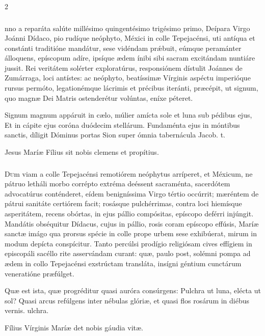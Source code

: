 \documentclass[9pt,twoside]{extarticle}
\begin{document}
\begin{multicols}{2}
\subsubsection*{\center {}}
nno a reparáta salúte millésimo quingentésimo trigésimo primo, Deípara Virgo Joánni Dídaco, pio rudíque neóphyto, Méxici in colle Tepejacénsi, uti antíqua et constánti traditióne mandátur, sese vidéndam prǽbuit, eúmque peramánter álloquens, epíscopum adíre, ipsíque ædem ínibi sibi sacram excitándam nuntiáre jussit. Rei veritátem solérter exploratúrus, responsiónem dístulit Joánnes de Zumárraga, loci antístes: ac neóphyto, beatíssimæ Vírginis aspéctu imperióque rursus permóto, legationémque lácrimis et précibus iteránti, præcépit, ut signum, quo magnæ Dei Matris ostenderétur volúntas, eníxe péteret.

\begin{tightlist}{}
\item {} Signum magnum appáruit in cælo, múlier amícta sole et luna sub pédibus ejus, \textred{*} Et in cápite ejus coróna duódecim stellárum.
 Fundaménta ejus in móntibus sanctis, díligit Dóminus portas Sion super ómnia tabernácula Jacob. t.
\item {\small {} Jesus Maríæ Fílius sit nobis clemens et propítius.}
\end{tightlist}

\subsubsection*{\center {}}
\lettrine{D}um viam a colle Tepejacénsi remotiórem neóphytus arríperet, et Méxicum, ne pátruo letháli morbo corrépto extréma deéssent sacraménta, sacerdótem advocatúrus conténderet, eídem benigníssima Virgo tértio occúrrit; mæréntem de pátrui sanitáte certiórem facit; rosásque pulchérrimas, contra loci hiemísque asperitátem, recens obórtas, in ejus pállio compósitas, epíscopo deférri injúngit. Mandátis obséquitur Dídacus, cujus in pállio, rosis coram epíscopo effúsis, Maríæ sanctæ imágo qua prorsus spécie in colle prope urbem sese exhibúerat, mirum in modum depícta conspícitur. Tanto percúlsi prodígio religiósam cives effígiem in episcopáli sacéllo rite asservándam curant: quæ, paulo post, solémni pompa ad ædem in collo Tepejacénsi exstrúctam transláta, insígni géntium cunctárum veneratióne præfúlget.

\begin{tightlist}{}
\item {} Quæ est ista, quæ progréditur quasi auróra consúrgens: \textred{*} Pulchra ut luna, elécta ut sol?
 Quasi arcus refúlgens inter nébulas glóriæ, et quasi flos rosárum in diébus vernis. ulchra.
\item {\small {} Fílius Vírginis Maríæ det nobis gáudia vitæ.}
\end{tightlist}


\end{multicols}
\end{document}
